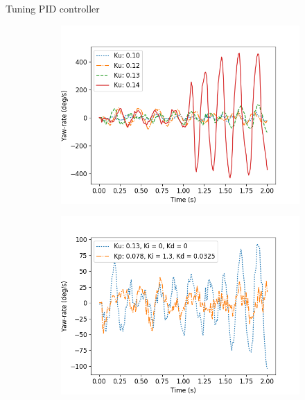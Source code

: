 \documentclass{beamer}
\begin{document}
\begin{frame}{Tuning PID controller}
	\begin{figure}
		\begin{center}
		\begin{subfigure}[b]{0.49\textwidth}
			\includegraphics[width=\textwidth]{pics/straight_ku.png}
		\end{subfigure}
		\begin{subfigure}[b]{0.49\textwidth}
			\includegraphics[width=\textwidth]{pics/straight_ku_with_tu.png}
		\end{subfigure}
		\end{center}
	\end{figure}
\end{frame}
\end{document}
